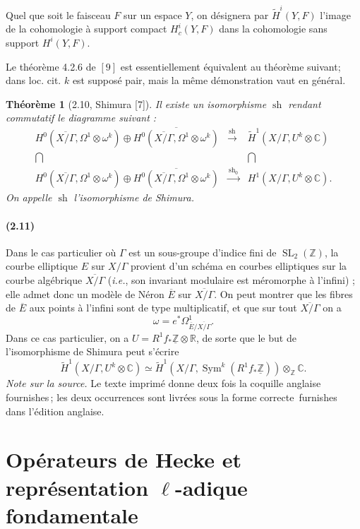 \documentclass[10pt]{article}
\newcommand{\C}{\mathbb C}
\newcommand{\R}{\mathbb R}
\newcommand{\Z}{\mathbb Z}
\newcommand{\SL}{\operatorname{SL}}
\newcommand{\Sym}{\operatorname{Sym}}
\newcommand{\sh}{\operatorname{sh}}
\newcommand{\frquote}[1]{\guillemotleft{}\,#1\,\guillemotright{}}
\newtheorem*{theorem}{Théorème}
\begin{document}
Quel que soit le faisceau $F$ sur un espace $Y$, on désignera par $\widetilde H^i(Y,F)$
l'image de la cohomologie à support compact $H^i_c(Y,F)$ dans la cohomologie sans
support $H^i(Y,F)$.

Le théorème 4.2.6 de \([9]\) est essentiellement équivalent au théorème suivant; dans
loc. cit. $k$ est supposé pair, mais la même démonstration vaut en général.

\begin{theorem}[2.10, Shimura {\rm [7]}]
Il existe un isomorphisme $\sh$ rendant commutatif le diagramme suivant :
\[
\begin{array}{ccc}
H^0(\overline{X/\Gamma},\Omega^1\otimes\omega^k)\oplus
\overline{H^0(\overline{X/\Gamma},\Omega^1\otimes\omega^k)}
& \xrightarrow{\ \sh\ } &
\widetilde H^1(X/\Gamma,U^k\otimes\C)
\\[0.4em]
\bigcap && \bigcap
\\[0.4em]
H^0(\overline{X/\Gamma},\Omega^1\otimes\omega^k)\oplus
\overline{H^0(\overline{X/\Gamma},\Omega^1\otimes\omega^k)}
& \xrightarrow{\ \sh_0\ } &
H^1(X/\Gamma,U^k\otimes\C).
\end{array}
\]
On appelle $\sh$ l'isomorphisme de Shimura.
\end{theorem}

\paragraph{(2.11)}
Dans le cas particulier où $\Gamma$ est un sous-groupe d'indice fini de $\SL_2(\Z)$, la
courbe elliptique $E$ sur $X/\Gamma$ provient d'un schéma en courbes elliptiques sur la
courbe algébrique $\overline{X/\Gamma}$ (\textit{i.e.}, son invariant modulaire est méromorphe
à l'infini) ; elle admet donc un modèle de Néron $\overline{E}$ sur $\overline{X/\Gamma}$.
On peut montrer que les fibres de $\overline{E}$ aux points à l'infini sont de type multiplicatif, et que
sur tout $\overline{X/\Gamma}$ on a
\[
\omega=e^*\Omega^1_{\overline{E}/\overline{X/\Gamma}}.
\]
Dans ce cas particulier, on a $U=R^1f_*\underline{\Z}\otimes\R$, de sorte que le but de l'isomorphisme
de Shimura peut s'écrire
\[
\widetilde H^1(X/\Gamma,U^k\otimes\C)
\simeq
\widetilde H^1(X/\Gamma,\Sym^k(R^1f_*\underline{\Z}))\otimes_\Z\C .
\]
\noindent\emph{Note sur la source.} Le texte imprimé donne deux fois la coquille anglaise \frquote{fournishes}; les deux occurrences sont livrées sous la forme correcte \frquote{furnishes} dans l'édition anglaise.

\section{Opérateurs de Hecke et représentation $\ell$-adique fondamentale}
\end{document}
